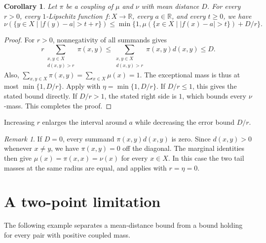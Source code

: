 \documentclass[a4paper,11pt]{article}
\newtheorem{corollary}[theorem]{Corollary}
\theoremstyle{definition}
\theoremstyle{remark}
\newtheorem{remark}[theorem]{Remark}
\begin{document}
\begin{corollary}\label{cor:mean}
Let $\pi$ be a coupling of $\mu$ and $\nu$ with mean distance $D$. For every $r>0$, every $1$-Lipschitz function $f\colon X\to\mathbb R$, every $a\in\mathbb R$, and every $t\geq0$, we have
\[ \nu(\{y\in X\mid |f(y)-a|>t+r\})\leq\min\{1,\mu(\{x\in X\mid |f(x)-a|>t\})+D/r\}. \]
\end{corollary}
\begin{proof}
For $r>0$, nonnegativity of all summands gives
\[ r\sum_{\substack{x,y\in X\\d(x,y)>r}}\pi(x,y)\leq\sum_{\substack{x,y\in X\\d(x,y)>r}}\pi(x,y)d(x,y)\leq D. \]
Also, $\sum_{x,y\in X}\pi(x,y)=\sum_{x\in X}\mu(x)=1$. The exceptional mass is thus at most $\min\{1,D/r\}$. Apply  with $\eta=\min\{1,D/r\}$. If $D/r\leq1$, this gives the stated bound directly. If $D/r>1$, the stated right side is $1$, which bounds every $\nu$-mass. This completes the proof.
\end{proof}

Increasing $r$ enlarges the interval around $a$ while decreasing the error bound $D/r$.

\begin{remark}\label{rem:zero}
If $D=0$, every summand $\pi(x,y)d(x,y)$ is zero. Since $d(x,y)>0$ whenever $x\neq y$, we have $\pi(x,y)=0$ off the diagonal. The marginal identities then give $\mu(x)=\pi(x,x)=\nu(x)$ for every $x\in X$. In this case the two tail masses at the same radius are equal, and  applies with $r=\eta=0$.
\end{remark}

\section{A two-point limitation}\label{sec:example}

The following example separates a mean-distance bound from a bound holding for every pair with positive coupled mass.
\end{document}
